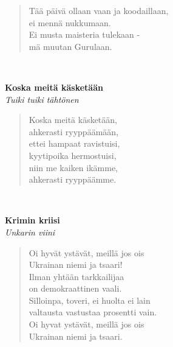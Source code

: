 \noindent\begin{minipage}{\linewidth}
\begin{verse}
	Tää päivä ollaan vaan ja koodaillaan,\\
	ei mennä nukkumaan.\\
	Ei musta maisteria tulekaan -\\
	mä muutan Gurulaan.\\
\end{verse}
\end{minipage}\\[10pt]
%
%
\noindent\begin{minipage}{\linewidth}
\vspace{5pt}
\parbox[t]{0.85\linewidth}{\raggedright {\large\bf Koska meitä käsketään}\\[2pt]\small\emph{Tuiki tuiki tähtönen}\\[6pt]}
\begin{verse}
	
	Koska meitä käsketään,\\
	ahkerasti ryyppäämään,\\
	ettei hampaat ravistuisi,\\
	kyytipoika hermostuisi,\\
	niin me kaiken ikämme,\\
	ahkerasti ryyppäämme.\\
\end{verse}
\end{minipage}\\[10pt]
%
%
\noindent\begin{minipage}{\linewidth}
\vspace{5pt}
\parbox[t]{0.85\linewidth}{\raggedright {\large\bf Krimin kriisi}\\[2pt]\small\emph{Unkarin viini}\\[6pt]}
\begin{verse}
	
	Oi hyvät ystävät, meillä jos ois\\
	Ukrainan niemi ja tsaari!\\
	Ilman yhtään tarkkailijaa\\
	on demokraattinen vaali.\\
	Silloinpa, toveri, ei huolta ei lain\\
	valtausta vastustaa prosentti vain.\\
	Oi hyvat ystävät, meillä jos ois\\
	Ukrainan niemi ja tsaari.\\
\end{verse}
\end{minipage}\\[10pt]

